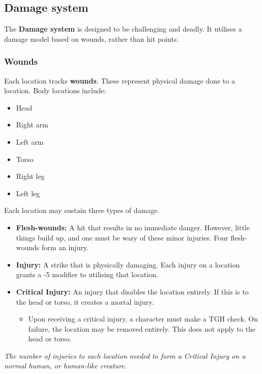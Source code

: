 \documentclass[12pt,]{article}
\providecommand{\tightlist}{%
  \setlength{\itemsep}{0pt}\setlength{\parskip}{0pt}}
\begin{document}
\subsection{Damage system}\label{damage-system}

The \textbf{Damage system} is designed to be challenging and deadly. It
utilises a damage model based on wounds, rather than hit points.

\subsubsection{Wounds}\label{wounds}

Each location tracks \textbf{wounds}. These represent physical damage
done to a location. Body locations include:

\begin{itemize}
\tightlist
\item
  Head
\item
  Right arm
\item
  Left arm
\item
  Torso
\item
  Right leg
\item
  Left leg
\end{itemize}

Each location may sustain three types of damage.

\begin{itemize}
\tightlist
\item
  \textbf{Flesh-wounds:} A hit that results in no immediate danger.
  However, little things build up, and one must be wary of these minor
  injuries. Four flesh-wounds form an injury.
\item
  \textbf{Injury:} A strike that is physically damaging. Each injury on
  a location grants a -5 modifier to utilising that location.
\item
  \textbf{Critical Injury:} An injury that disables the location
  entirely. If this is to the head or torso, it creates a mortal injury.

  \begin{itemize}
  \tightlist
  \item
    Upon receiving a critical injury, a character must make a TGH check.
    On failure, the location may be removed entirely. This does not
    apply to the head or torso.
  \end{itemize}
\end{itemize}

\emph{The number of injuries to each location needed to form a Critical
Injury on a normal human, or human-like creature.}
\end{document}
